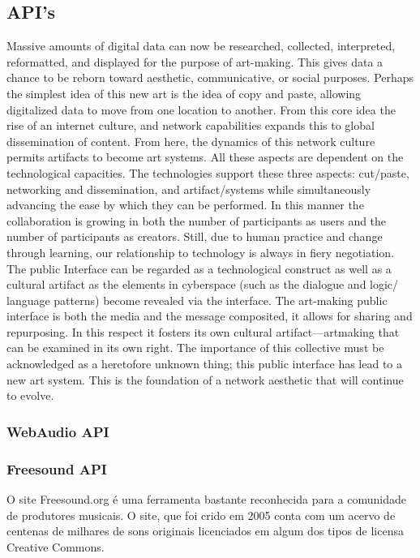 \subsection{API's}
\begin{citacao}
Massive amounts of digital data can now be researched, collected, interpreted, reformatted, and displayed for the purpose of art-making. This gives data a chance to be reborn toward aesthetic, communicative, or social purposes. Perhaps the simplest idea of this new art is the idea of copy and paste, allowing digitalized data to move from one location to another. From this core idea the rise of an internet culture, and network capabilities expands this to global dissemination of content. From here, the dynamics of this network culture permits artifacts to become art systems. All these aspects are dependent on the technological capacities. The technologies support these three aspects: cut/paste, networking and dissemination, and artifact/systems while simultaneously advancing the ease by which they can be performed. In this manner the collaboration is growing in both the number of participants as users and the number of participants as creators. Still, due to human practice and change through learning, our relationship to technology is always in fiery negotiation. The public Interface can be regarded as a technological construct as well as a cultural artifact as the elements in cyberspace (such as the dialogue and logic/ language patterns) become revealed via the interface. The art-making public interface is both the media and the message composited, it allows for sharing and repurposing. In this respect it fosters its own cultural artifact—artmaking that can be examined in its own right. The importance of this collective must be acknowledged as a heretofore unknown thing; this public interface has lead to a new art system. This is the foundation of a network aesthetic that will continue to evolve.
\cite[5]{Soon2011}
\end{citacao}

\subsubsection{WebAudio API}

\subsubsection{Freesound API}
O site Freesound.org \cite{Font2013} é uma ferramenta bastante reconhecida para a comunidade de produtores musicais. O site, que foi crido em 2005 conta com um acervo de centenas de milhares de sons originais licenciados em algum dos tipos de licensa Creative Commons. 

